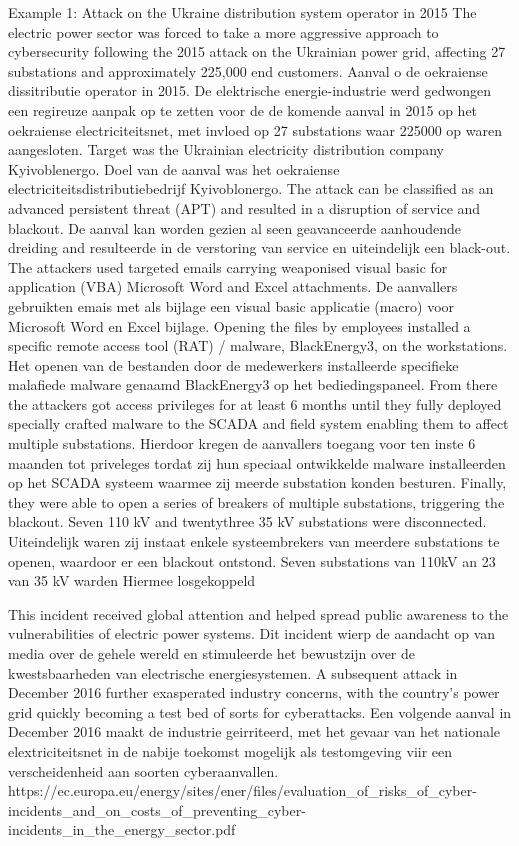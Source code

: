 {Example 1: Attack on the Ukraine distribution system operator in 2015 The electric power sector was
forced to take a more aggressive approach to cybersecurity following the 2015 attack on the
Ukrainian power grid, affecting 27 substations and approximately 225,000 end customers. Aanval o
de oekraiense dissitributie operator in 2015. De elektrische energie-industrie werd gedwongen een
regireuze aanpak op te zetten voor de de komende aanval in 2015 op het oekraiense electriciteitsnet,
met invloed op 27 substations waar 225000 op waren aangesloten.
Target was the Ukrainian electricity distribution company Kyivoblenergo. Doel van de aanval was het
oekraiense electriciteitsdistributiebedrijf Kyivoblonergo.
The attack can be classified as an advanced persistent threat (APT) and resulted in a disruption of
service and blackout. De aanval kan worden gezien al seen geavanceerde aanhoudende dreiding and
resulteerde in de verstoring van service en uiteindelijk een black-out.
The attackers used targeted emails carrying weaponised visual basic for application (VBA) Microsoft
Word and Excel attachments. De aanvallers gebruikten emais met als bijlage een visual basic
applicatie (macro) voor Microsoft Word en Excel bijlage.
Opening the files by employees installed a specific remote access tool (RAT) / malware,
BlackEnergy3, on the workstations. Het openen van de bestanden door de medewerkers installeerde
specifieke malafiede malware genaamd BlackEnergy3 op het bediedingspaneel.
From there the attackers got access privileges for at least 6 months until they fully deployed specially
crafted malware to the SCADA and field system enabling them to affect multiple substations.
Hierdoor kregen de aanvallers toegang voor ten inste 6 maanden tot priveleges tordat zij hun
speciaal ontwikkelde malware installeerden op het SCADA systeem waarmee zij meerde substation
konden besturen.
Finally, they were able to open a series of breakers of multiple substations, triggering the blackout.
Seven 110 kV and twentythree 35 kV substations were disconnected. Uiteindelijk waren zij instaat
enkele systeembrekers van meerdere substations te openen, waardoor er een blackout ontstond.
Seven substations van 110kV an 23 van 35 kV warden Hiermee losgekoppeld

This incident received global attention and helped spread public awareness to the vulnerabilities of
electric power systems. Dit incident wierp de aandacht op van media over de gehele wereld en
stimuleerde het bewustzijn over de kwestsbaarheden van electrische energiesystemen.
A subsequent attack in December 2016 further exasperated industry concerns, with the country’s
power grid quickly becoming a test bed of sorts for cyberattacks. Een volgende aanval in December
2016 maakt de industrie geirriteerd, met het gevaar van het nationale elextriciteitsnet in de nabije
toekomst mogelijk als testomgeving viir een verscheidenheid aan soorten cyberaanvallen.
https://ec.europa.eu/energy/sites/ener/files/evaluation_of_risks_of_cyber-
incidents_and_on_costs_of_preventing_cyber-incidents_in_the_energy_sector.pdf

}
